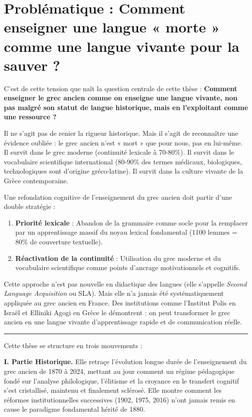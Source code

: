 
\section*{Problématique : Comment enseigner une langue « morte » comme une langue vivante pour la sauver ?}

C'est de cette tension que naît la question centrale de cette thèse : \textbf{Comment enseigner le grec ancien comme on enseigne une langue vivante, non pas malgré son statut de langue historique, mais en l'exploitant comme une ressource ?}

Il ne s'agit pas de renier la rigueur historique. Mais il s'agit de reconnaître une évidence oubliée : le grec ancien n'est « mort » que pour nous, pas en lui-même. Il survit dans le grec moderne (continuité lexicale à 70-80\%). Il survit dans le vocabulaire scientifique international (80-90\% des termes médicaux, biologiques, technologiques sont d'origine gréco-latine). Il survit dans la culture vivante de la Grèce contemporaine.

Une refondation cognitive de l'enseignement du grec ancien doit partir d'une double stratégie :
\begin{enumerate}
\item \textbf{Priorité lexicale} : Abandon de la grammaire comme socle pour la remplacer par un apprentissage massif du noyau lexical fondamental (1100 lemmes = 80\% de couverture textuelle).
\item \textbf{Réactivation de la continuité} : Utilisation du grec moderne et du vocabulaire scientifique comme points d'ancrage motivationnels et cognitifs.
\end{enumerate}

Cette approche n'est pas nouvelle en didactique des langues (elle s'appelle \textit{Second Language Acquisition} ou SLA). Mais elle n'a jamais été systématiquement appliquée au grec ancien en France. Des institutions comme l'Institut Polis en Israël et Elliniki Agogi en Grèce le démontrent : on peut transformer le grec ancien en une langue vivante d'apprentissage rapide et de communication réelle.

\vspace{0.5cm}

\noindent\rule{\textwidth}{0.5pt}

Cette thèse se structure en trois mouvements :

\textbf{I. Partie Historique.} Elle retraçe l'évolution longue durée de l'enseignement du grec ancien de 1870 à 2024, mettant au jour comment un régime pédagogique fondé sur l'analyse philologique, l'élitisme et la croyance en le transfert cognitif s'est cristallisé, maintenu et finalement sclérosé. Elle montre comment les réformes institutionnelles successives (1902, 1975, 2016) n'ont jamais remis en cause le paradigme fondamental hérité de 1880.


